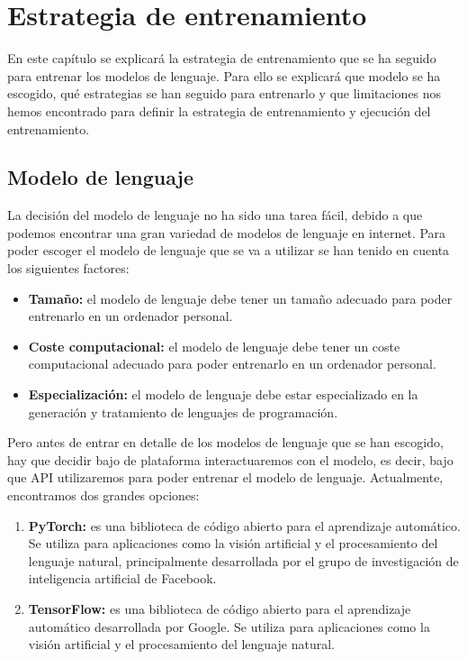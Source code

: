 \chapter{Estrategia de entrenamiento}
\label{cap:estrategia_entrenamiento}


En este capítulo se explicará la estrategia de entrenamiento que se ha seguido para
entrenar los modelos de lenguaje. Para ello se explicará que modelo se ha escogido,
qué estrategias se han seguido para entrenarlo y que limitaciones nos hemos encontrado
para definir la estrategia de entrenamiento y ejecución del entrenamiento.

\section{Modelo de lenguaje}
\label{sec:modelo_lenguaje}


La decisión del modelo de lenguaje no ha sido una tarea fácil, debido a que podemos
encontrar una gran variedad de modelos de lenguaje en internet. Para poder escoger
el modelo de lenguaje que se va a utilizar se han tenido en cuenta los siguientes
factores:

\begin{itemize}
    \item \textbf{Tamaño:} el modelo de lenguaje debe tener un tamaño adecuado
        para poder entrenarlo en un ordenador personal.
    \item \textbf{Coste computacional:} el modelo de lenguaje debe tener un coste
        computacional adecuado para poder entrenarlo en un ordenador personal.
    \item \textbf{Especialización:} el modelo de lenguaje debe estar especializado
        en la generación y tratamiento de lenguajes de programación.
\end{itemize}

Pero antes de entrar en detalle de los modelos de lenguaje que se han escogido,
hay que decidir bajo de plataforma interactuaremos con el modelo, es decir, bajo
que API utilizaremos para poder entrenar el modelo de lenguaje. Actualmente, encontramos
dos grandes opciones:

\begin{enumerate}
    \item \textbf{PyTorch:} es una biblioteca de código abierto para el aprendizaje
        automático. Se utiliza para aplicaciones como la visión artificial y el
        procesamiento del lenguaje natural, principalmente desarrollada por el
        grupo de investigación de inteligencia artificial de Facebook. \cite{PyTorch}
    \item \textbf{TensorFlow:} es una biblioteca de código abierto para el aprendizaje
        automático desarrollada por Google. Se utiliza para aplicaciones como la visión
        artificial y el procesamiento del lenguaje natural. \cite{TensorFlow}
\end{enumerate}

